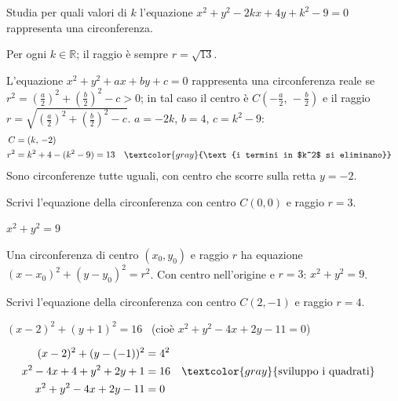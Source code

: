 \begin{question}[ID=1.5, subtitle={Raggio costante al variare di $k$}, difficulty=media, tags={circonferenza, parametri}]
Studia per quali valori di $k$ l'equazione $x^2+y^2-2kx+4y+k^2-9=0$ rappresenta una circonferenza.
\begin{solution}
Per ogni $k\in\mathbb{R}$; il raggio è sempre $r=\sqrt{13}$.
\end{solution}
\begin{explanation}
L'equazione $x^2+y^2+ax+by+c=0$ rappresenta una circonferenza reale se $r^2=\left(\tfrac a2\right)^2+\left(\tfrac b2\right)^2-c>0$; in tal caso il centro è $C\left(-\tfrac a2,\,-\tfrac b2\right)$ e il raggio $r=\sqrt{\left(\tfrac a2\right)^2+\left(\tfrac b2\right)^2-c}$.
$a=-2k$, $b=4$, $c=k^2-9$:
\[\begin{aligned}
C &= (k,\,-2)\\
r^2 &= k^2+4-(k^2-9)=13 && \textcolor{gray}{\text{i termini in $k^2$ si eliminano}}
\end{aligned}\]
Sono circonferenze tutte uguali, con centro che scorre sulla retta $y=-2$.
\end{explanation}
\end{question}

\begin{question}[ID=2.1, subtitle={Circonferenza con centro nell'origine e $r=3$}, difficulty=facile, tags={circonferenza}]
Scrivi l'equazione della circonferenza con centro $C(0,0)$ e raggio $r=3$.
\begin{solution}
$x^2+y^2=9$
\end{solution}
\begin{explanation}
Una circonferenza di centro $(x_0,y_0)$ e raggio $r$ ha equazione $(x-x_0)^2+(y-y_0)^2=r^2$. Con centro nell'origine e $r=3$: $x^2+y^2=9$.
\end{explanation}
\end{question}


\begin{question}[ID=2.2, subtitle={Circonferenza con centro $C(2,-1)$ e $r=4$}, difficulty=facile, tags={circonferenza}]
Scrivi l'equazione della circonferenza con centro $C(2,-1)$ e raggio $r=4$.
\begin{solution}
$(x-2)^2+(y+1)^2=16$ \ (cioè $x^2+y^2-4x+2y-11=0$)
\end{solution}
\begin{explanation}
\[\begin{aligned}
(x-2)^2+(y-(-1))^2 &= 4^2\\
x^2-4x+4+y^2+2y+1 &= 16 && \textcolor{gray}{\text{sviluppo i quadrati}}\\
x^2+y^2-4x+2y-11 &= 0
\end{aligned}\]
\end{explanation}
\end{question}

